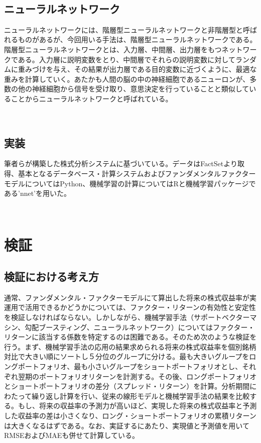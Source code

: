 \ 
\subsection{ニューラルネットワーク}
ニューラルネットワークには、階層型ニューラルネットワークと非階層型と呼ばれるものがあるが、今回用いる手法は、階層型ニューラルネットワークである。階層型ニューラルネットワークとは、入力層、中間層、出力層をもつネットワークである。入力層に説明変数をとり、中間層でそれらの説明変数に対してランダムに重みづけを与え、その結果が出力層である目的変数に近づくように、最適な重みを計算していく。あたかも人間の脳の中の神経細胞であるニューロンが、多数の他の神経細胞から信号を受け取り、意思決定を行っていることと類似していることからニューラルネットワークと呼ばれている。

\ 
\subsection{実装}
筆者らが構築した株式分析システムに基づいている。データはFactSetより取得、基本となるデータベース・計算システムおよびファンダメンタルファクターモデルについてはPython、機械学習の計算についてはRと機械学習パッケージである'nnet'を用いた。


\ 
\section{検証} %
\subsection{検証における考え方}
通常、ファンダメンタル・ファクターモデルにて算出した将来の株式収益率が実運用で活用できるかどうかについては、ファクター・リターンの有効性と安定性を検証しなければならない。しかしながら、機械学習手法（サポートベクターマシン、勾配ブースティング、ニューラルネットワーク）についてはファクター・リターンに該当する係数を特定するのは困難である。そのため次のような検証を行う。まず、機械学習手法の応用の結果求められる将来の株式収益率を個別銘柄対比で大きい順にソートし５分位のグループに分ける。最も大きいグループをロングポートフォリオ、最も小さいグループをショートポートフォリオとし、それぞれ翌期のポートフォリオリターンを計測する。その後、ロングポートフォリオとショートポートフォリオの差分（スプレッド・リターン）を計算。分析期間にわたって繰り返し計算を行い、従来の線形モデルと機械学習手法の結果を比較する。もし、将来の収益率の予測力が高いほど、実現した将来の株式収益率と予測した収益率の差は小さくなり、ロング・ショートポートフォリオの累積リターンは大きくなるはずである。なお、実証するにあたり、実現値と予測値を用いてRMSEおよびMAEも併せて計算している。

